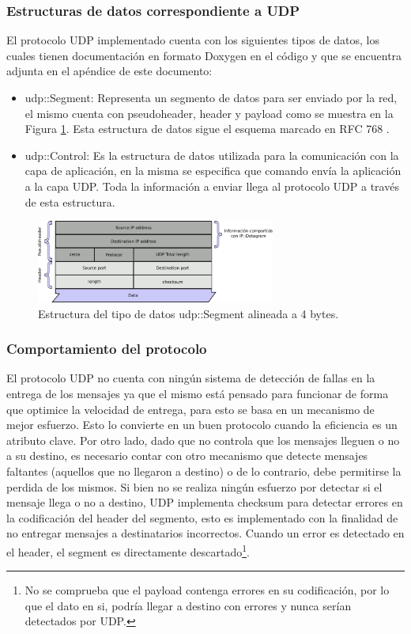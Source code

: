 \documentclass[10pt,a4paper]{article}
\begin{document}
\subsubsection{Estructuras de datos correspondiente a UDP}

El protocolo UDP implementado cuenta con los siguientes tipos de datos, los cuales tienen documentación en formato Doxygen en el código y que se encuentra adjunta en el apéndice de este documento:

\begin{itemize}
\item udp::Segment: Representa un segmento de datos para ser enviado por la red, el mismo cuenta con pseudoheader, header y payload como se muestra en la Figura \ref{figure: udp segment}. Esta estructura de datos sigue el esquema marcado en RFC 768 \cite{postel1980user}.
\item udp::Control: Es la estructura de datos utilizada para la comunicación con la capa de aplicación, en la misma se especifica que comando envía la aplicación a la capa UDP. Toda la información a enviar llega al protocolo UDP a través de esta estructura.
\end{itemize}

\begin{figure}[!htb]
    \centering
    \includegraphics[width = 0.7\textwidth]{img/png/UDP-Segment.png}
    \caption{Estructura del tipo de datos udp::Segment alineada a 4 bytes.}
    \label{figure: udp segment}
\end{figure}

\subsubsection{Comportamiento del protocolo}

El protocolo UDP no cuenta con ningún sistema de detección de fallas en la entrega de los mensajes ya que el mismo está pensado para funcionar de forma que optimice la velocidad de entrega, para esto se basa en un mecanismo de mejor esfuerzo. Esto lo convierte en un buen protocolo cuando la eficiencia es un atributo clave. Por otro lado, dado que no controla que los mensajes lleguen o no a su destino, es necesario contar con otro mecanismo que detecte mensajes faltantes (aquellos que no llegaron a destino) o de lo contrario, debe permitirse la perdida de los mismos. Si bien no se realiza ningún esfuerzo por detectar si el mensaje llega o no a destino, UDP implementa checksum para detectar errores en la codificación del header del segmento, esto es implementado con la finalidad de no entregar mensajes a destinatarios incorrectos. Cuando un error es detectado en el header, el segment es directamente descartado\footnote{No se comprueba que el payload contenga errores en su codificación, por lo que el dato en si, podría llegar a destino con errores y nunca serían detectados por UDP.}.\\
\end{document}
